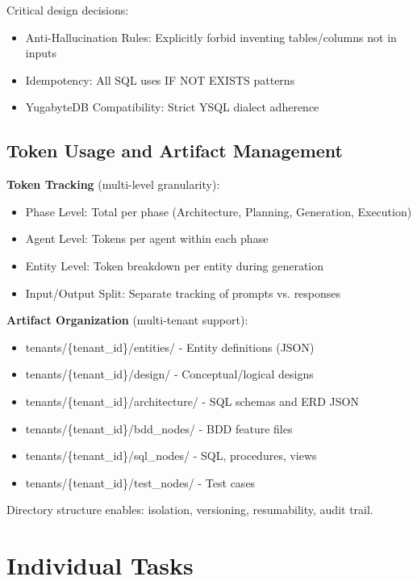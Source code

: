 \documentclass[12pt,a4paper]{article}
\begin{document}
Critical design decisions:
\begin{itemize}
\item Anti-Hallucination Rules: Explicitly forbid inventing tables/columns not in inputs
\item Idempotency: All SQL uses IF NOT EXISTS patterns
\item YugabyteDB Compatibility: Strict YSQL dialect adherence
\end{itemize}

\subsection{Token Usage and Artifact Management}

\textbf{Token Tracking} (multi-level granularity):
\begin{itemize}
\item Phase Level: Total per phase (Architecture, Planning, Generation, Execution)
\item Agent Level: Tokens per agent within each phase
\item Entity Level: Token breakdown per entity during generation
\item Input/Output Split: Separate tracking of prompts vs. responses
\end{itemize}

\textbf{Artifact Organization} (multi-tenant support):
\begin{itemize}
\item tenants/\{tenant\_id\}/entities/ - Entity definitions (JSON)
\item tenants/\{tenant\_id\}/design/ - Conceptual/logical designs
\item tenants/\{tenant\_id\}/architecture/ - SQL schemas and ERD JSON
\item tenants/\{tenant\_id\}/bdd\_nodes/ - BDD feature files
\item tenants/\{tenant\_id\}/sql\_nodes/ - SQL, procedures, views
\item tenants/\{tenant\_id\}/test\_nodes/ - Test cases
\end{itemize}

Directory structure enables: isolation, versioning, resumability, audit trail.

\section{Individual Tasks}
\end{document}
